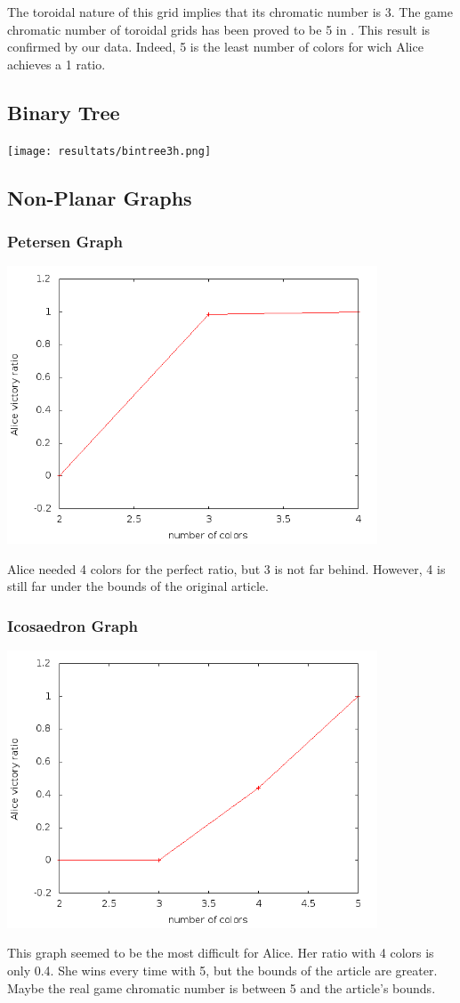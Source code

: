 The toroidal nature of this grid implies that its chromatic number is 3. The game chromatic number of toroidal grids has been proved to be 5 in \cite{Raspaud20091183}. This result is confirmed by our data. Indeed, 5 is the least number of colors for wich Alice achieves a 1 ratio.

\subsection{Binary Tree}

\texttt{[image: resultats/bintree3h.png]}

\subsection{Non-Planar Graphs}

\subsubsection{Petersen Graph}

\includegraphics[width=11cm]{resultats/petersen.png}

Alice needed 4 colors for the perfect ratio, but 3 is not far behind. However, 4 is still far under the bounds of the original article.

\subsubsection{Icosaedron Graph}

\includegraphics[width=11cm]{resultats/icosaedre.png}

This graph seemed to be the most difficult for Alice. Her ratio with 4 colors is only 0.4. She wins every time with 5, but the bounds of the article are greater. Maybe the real game chromatic number is between 5 and the article's bounds.